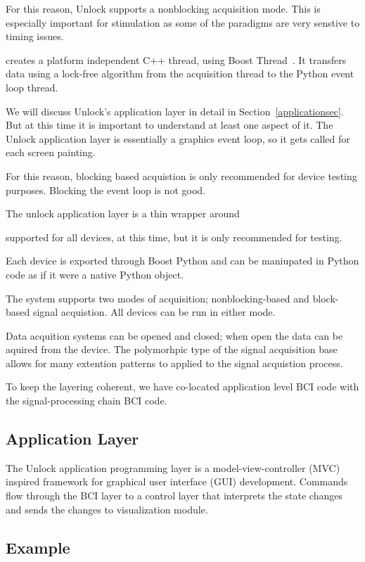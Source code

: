 \documentclass[11pt]{article}
\begin{document}
For this reason, Unlock supports a nonblocking acquisition mode.  This is especially important for stimulation as some of the paradigms are very senstive to timing issues.

 creates a platform independent C++ thread, using Boost Thread~\cite{boostthread}.  It transfers data using a lock-free algorithm from the acquisition thread to the Python event loop thread.

We will discuss Unlock's application layer in detail in Section~\ref{applicationsec}.  But at this time it is important to understand at least one aspect of it.  The Unlock application layer is essentially a graphics event loop, so it gets called for each screen painting.

For this reason, blocking based acquistion is only recommended for device testing purposes.  Blocking the event loop is not good.

The unlock application layer is a thin wrapper around

 supported for all devices, at this time, but it is only recommended for testing.  

Each device is exported through Boost Python and can be maniupated in Python code as if it were a native Python object.

The system supports two modes of acquisition; nonblocking-based and block-based signal acquistion.  All devices can be run in either mode.  

Data acquition systems can be opened and closed; when open the data can be aquired from the device.  The polymorhpic type of the signal acquisition base allows for many extention patterns to applied to the signal acquistion process.

To keep the layering coherent, we have co-located application level BCI code with the signal-processing chain BCI code.

\subsection{Application Layer}

The Unlock application programming layer is a model-view-controller (MVC)~\cite{mvc, mvc2} inspired framework for graphical user interface (GUI) development.  Commands flow through the BCI layer to a control layer that interprets the state changes and sends the changes to visualization module.

\subsection{Example}
\end{document}

